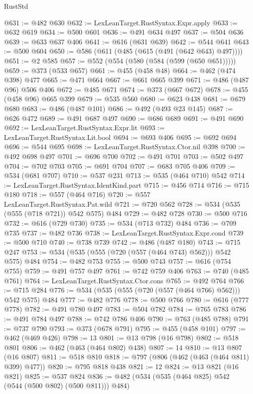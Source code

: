 \begin{lexlean}{RustStd}
\begin{coremodule}
@631 := @482 @630
@632 := LexLeanTarget.RustSyntax.Expr.apply
@633 := @632 @619
@634 := @500 @601
@636 := @491 @634 @497
@637 := @504 @636
@639 := @633 @637 @406
@641 := @616 (@631 @639)
@642 := @544 @641
@643 := @500 @604
@650 := @586 (@611 (@485 (@615 (@491 (@642 @643) @497))))
@651 := @2 @585
@657 := @552 (@554 (@580 (@584 (@599 (@650 @651)))))
@659 := @373 (@533 @657)
@661 := @455 (@458 @48)
@664 := @462 (@474 @398) @477
@665 := @471 @664
@667 := @661 @665 @399
@671 := @486 (@487 @96) @506 @406
@672 := @485 @671
@674 := @373 (@667 @672)
@678 := @455 (@458 @96) @665 @399
@679 := @535 @560
@680 := @623 @438
@681 := @679 @680
@683 := @486 (@487 @101)
@686 := @492 (@493 @23 @145)
@687 := @626 @472
@689 := @491 @687 @497
@690 := @686 @689
@691 := @491 @690
@692 := LexLeanTarget.RustSyntax.Expr.lit
@693 := LexLeanTarget.RustSyntax.Lit.bool
@694 := @693 @406
@695 := @692 @694
@696 := @544 @695
@698 := LexLeanTarget.RustSyntax.Ctor.nil @398
@700 := @492 @698 @497
@701 := @696 @700
@702 := @491 @701
@703 := @502 @497
@704 := @702 @703
@705 := @691 @704
@707 := @683 @705 @406
@709 := @534 (@681 @707)
@710 := @537 @231
@713 := @535 (@464 @710) @542
@714 := LexLeanTarget.RustSyntax.IdentKind.part
@715 := @456 @714
@716 := @715 @180
@718 := @557 (@464 @716)
@720 := @557 LexLeanTarget.RustSyntax.Pat.wild
@721 := @720 @562
@728 := @534 (@535 (@555 (@718 @721)) @542 @575) @484
@729 := @482 @728
@730 := @500 @716
@732 := @616 (@729 @730)
@735 := @534 (@713 @732) @484
@736 := @709 @735
@737 := @482 @736
@738 := LexLeanTarget.RustSyntax.Expr.cond
@739 := @500 @710
@740 := @738 @739
@742 := @486 (@487 @180)
@743 := @715 @247
@753 := @534 (@535 (@555 (@720 (@557 (@464 @743) @562))) @542 @575) @484
@754 := @482 @753
@755 := @500 @743
@757 := @616 (@754 @755)
@759 := @491 @757 @497
@761 := @742 @759 @406
@763 := @740 (@485 @761)
@764 := LexLeanTarget.RustSyntax.Ctor.cons
@765 := @492 @764
@766 := @715 @284
@776 := @534 (@535 (@555 (@720 (@557 (@464 @766) @562))) @542 @575) @484
@777 := @482 @776
@778 := @500 @766
@780 := @616 (@777 @778)
@782 := @491 @780 @497
@783 := @504 @782
@784 := @765 @783
@786 := @491 @784 @497
@788 := @742 @786 @406
@790 := @763 (@485 @788)
@791 := @737 @790
@793 := @373 (@678 @791)
@795 := @455 (@458 @101)
@797 := @462 (@469 @426)
@798 := 13
@801 := @13 @798 (@16 @798)
@802 := @518 @801
@806 := @462 (@463 (@464 @802) @438)
@807 := 14
@810 := @13 @807 (@16 @807)
@811 := @518 @810
@818 := @797 (@806 (@462 (@463 (@464 @811) @399) @477))
@820 := @795 @818 @438
@821 := 12
@824 := @13 @821 (@16 @821)
@825 := @537 @824
@836 := @482 (@534 (@535 (@464 @825) @542 (@544 (@500 @802) (@500 @811))) @484)

\end{coremodule}
\end{lexlean}
